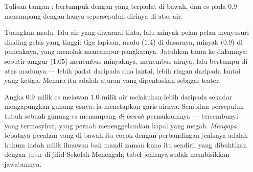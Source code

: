 \begin{omfigure}

{\small Tulisan tangan :  bertumpuk dengan yang
terpadat di bawah, dan es pada $0.9$ menumpang dengan hanya
sepersepuluh dirinya di atas air.}
\end{omfigure}

\begin{example}\label{ex:g6:density-floating:tower}
Tuangkan madu, lalu air yang diwarnai tinta, lalu minyak pelan-pelan
menyusuri dinding gelas yang tinggi: tiga lapisan, madu ($1.4$) di
dasarnya, minyak ($0.9$) di puncaknya, yang menolak mencampur
pangkatnya. Jatuhkan tamu ke dalamnya: sebutir anggur ($1.05$)
 menembus minyaknya,  menembus airnya, lalu
bertumpu di atas madunya --- lebih padat daripada dua lantai, lebih
ringan daripada lantai yang ketiga. Menara itu adalah aturan 
yang dipentaskan sebagai teater.
\end{example}

\begin{remark}\label{rem:g6:density-floating:iceberg}
Angka $0.9$ milik es melawan $1.0$ milik air melakukan lebih daripada
sekadar mengapungkan gunung esnya: ia menetapkan garis airnya.
Sembilan persepuluh tubuh sebuah gunung es menumpang \emph{di bawah}
permukaannya ---  tersembunyi yang termasyhur, yang pernah
menenggelamkan kapal yang megah. \emph{Mengapa} tepatnya pecahan yang
di bawah itu cocok dengan perbandingan  jenisnya adalah hukum
indah milik ilmuwan bak mandi zaman kuno itu sendiri, yang dibuktikan
dengan jujur di jilid Sekolah Menengah; tabel  jenisnya sudah
membisikkan jawabannya.
\end{remark}

